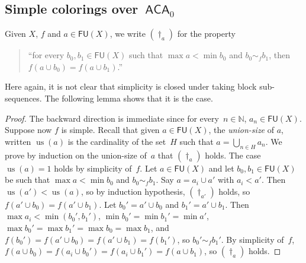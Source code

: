 \documentclass[10pt,a4paper]{article}
\newcommand{\ACA}[0]{\mathsf{ACA}}
\newcommand{\NN}[0]{\mathbb{N}}
\newcommand{\us}{\operatorname{us}}
\newcommand{\FU}[0]{\mathsf{FU}} %
\def\qt#1{``#1''}%
\numberwithin{theorem}{section}
\newtheorem{lemma}[theorem]{Lemma}
\begin{document}
\subsection{Simple colorings over~$\ACA_0$}

Given $X$, $f$ and $a \in \FU(X)$, we write $(\dagger_a)$ for the property 
\begin{quote}
\qt{for every $b_0, b_1 \in \FU(X)$ such that $\max a < \min b_0$ and $b_0 \sim_f b_1$, then $f(a \cup b_0) = f(a \cup b_1)$.}
\end{quote}

Here again, it is not clear that simplicity is closed under taking block sub-sequences.
The following lemma shows that it is the case.

\begin{proof}
The backward direction is immediate since for every~$n \in \NN$, $a_n \in \FU(X)$.
Suppose now $f$ is simple. Recall that given $a \in \FU(X)$, the \emph{union-size} of $a$, written $\us(a)$ is the cardinality of the set~$H$ such that $a = \bigcup_{n \in H} a_n$. We prove by induction on the union-size of~$a$ that $(\dagger_{a})$ holds. The case $\us(a) = 1$ holds by simplicity of~$f$. Let $a \in \FU(X)$ and let $b_0, b_1 \in \FU(X)$ be such that $\max a < \min b_0$ and $b_0 \sim_f b_1$. Say $a = a_i \cup a'$ with $a_i < a'$.
Then $\us(a') < \us(a)$, so by induction hypothesis, $(\dagger_{a'})$ holds, so $f(a' \cup b_0) = f(a' \cup b_1)$.
Let $b_0' = a' \cup b_0$ and $b_1' = a' \cup b_1$. Then $\max a_i < \min(b_0',b_1')$, $\min b_0' = \min b_1' = \min a'$, $\max b_0' = \max b_1'=  \max b_0 = \max b_1$, and $f(b_0') = f(a' \cup b_0) = f(a' \cup b_1) = f(b_1')$, so $b_0' \sim_f b_1'$. By simplicity of~$f$, $f(a \cup b_0) = f(a_i \cup b_0') = f(a_i \cup b_1') = f(a \cup b_1)$, so $(\dagger_a)$ holds. 
\end{proof}
\end{document}

